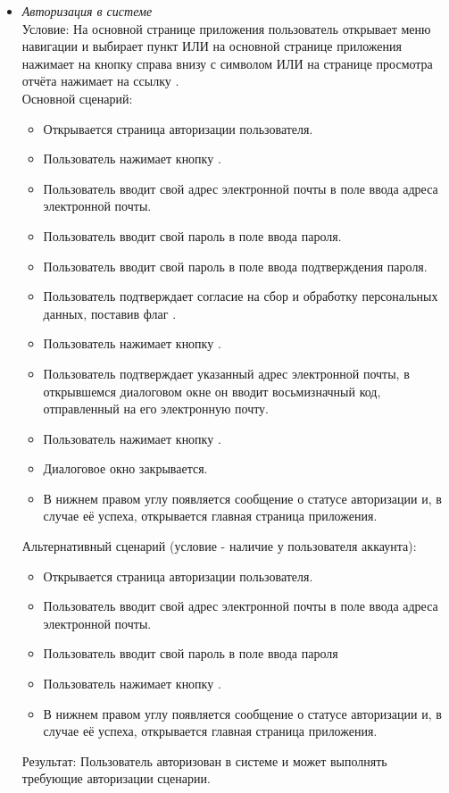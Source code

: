 \begin{itemize}[topsep=0pt, parsep=0pt, itemsep=0pt, leftmargin=*, labelindent=0.5cm]
	\item \textit{Авторизация в системе} \\
	Условие: На основной странице приложения пользователь открывает меню навигации и выбирает пункт  ИЛИ на основной странице приложения нажимает на кнопку справа внизу с символом \textquote{+} ИЛИ на странице просмотра отчёта нажимает на ссылку . \\
	Основной сценарий:
	\begin{itemize}[topsep=0pt, parsep=0pt, itemsep=0pt, leftmargin=*, labelindent=0.5cm]
		\item Открывается страница авторизации пользователя.
		\item Пользователь нажимает кнопку .
		\item Пользователь вводит свой адрес электронной почты в поле ввода адреса электронной почты.
		\item Пользователь вводит свой пароль в поле ввода пароля.
		\item Пользователь вводит свой пароль в поле ввода подтверждения пароля.
		\item Пользователь подтверждает согласие на сбор и обработку персональных данных, поставив флаг .
		\item Пользователь нажимает кнопку .
		\item Пользователь подтверждает указанный адрес электронной почты, в открывшемся диалоговом окне он вводит восьмизначный код, отправленный на его электронную почту.
		\item Пользователь нажимает кнопку .
		\item Диалоговое окно закрывается.
		\item В нижнем правом углу появляется сообщение о статусе авторизации и, в случае её успеха, открывается главная страница приложения.
	\end{itemize}
	Альтернативный сценарий (условие - наличие у пользователя аккаунта):
	\begin{itemize}[topsep=0pt, parsep=0pt, itemsep=0pt, leftmargin=*, labelindent=0.5cm]
		\item Открывается страница авторизации пользователя.
		\item Пользователь вводит свой адрес электронной почты в поле ввода адреса электронной почты.
		\item Пользователь вводит свой пароль в поле ввода пароля
		\item Пользователь нажимает кнопку .
		\item В нижнем правом углу появляется сообщение о статусе авторизации и, в случае её успеха, открывается главная страница приложения.
	\end{itemize}
	Результат: Пользователь авторизован в системе и может выполнять требующие авторизации сценарии.
	

\end{itemize}
